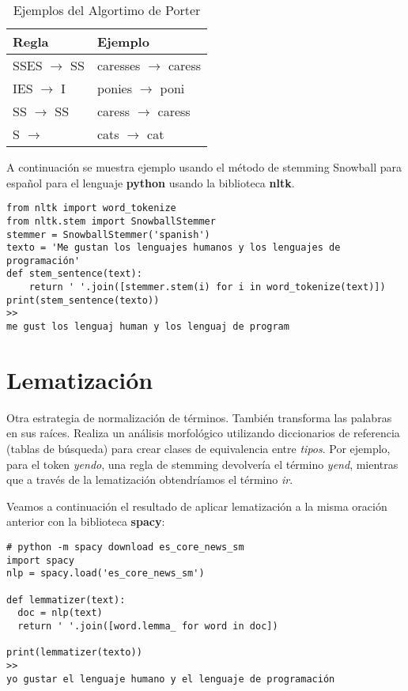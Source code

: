 \begin{table}[h]
\centering
\begin{tabular}{|l|l|}
\hline
Regla & Ejemplo \\
\hline
SSES $\rightarrow$ SS & caresses $\rightarrow$ caress \\
IES $\rightarrow$ I & ponies $\rightarrow$ poni \\
SS $\rightarrow$ SS & caress $\rightarrow$ caress \\
S $\rightarrow$ & cats $\rightarrow$ cat \\
\hline
\end{tabular}
\caption{Ejemplos del Algortimo de Porter}
\label{tab:porter}
\end{table}

A continuación se muestra ejemplo usando el método de stemming Snowball para español para el lenguaje \textbf{python} usando la biblioteca \textbf{nltk}.

\begin{verbatim}
from nltk import word_tokenize
from nltk.stem import SnowballStemmer
stemmer = SnowballStemmer('spanish')
texto = 'Me gustan los lenguajes humanos y los lenguajes de programación'
def stem_sentence(text):
    return ' '.join([stemmer.stem(i) for i in word_tokenize(text)])    
print(stem_sentence(texto))
>>
me gust los lenguaj human y los lenguaj de program
\end{verbatim}



\section{Lematización}
Otra estrategia de normalización de términos. También transforma las palabras en sus raíces.  Realiza un análisis morfológico utilizando diccionarios de referencia (tablas de búsqueda) para crear clases de equivalencia entre \emph{tipos}. Por ejemplo, para el token \emph{yendo}, una regla de stemming devolvería el término \emph{yend}, mientras que a través de la lematización obtendríamos el término \emph{ir}.

Veamos a continuación el resultado de aplicar lematización a la misma oración anterior con la biblioteca \textbf{spacy}:

\begin{verbatim}
# python -m spacy download es_core_news_sm
import spacy
nlp = spacy.load('es_core_news_sm')

def lemmatizer(text):  
  doc = nlp(text)
  return ' '.join([word.lemma_ for word in doc])

print(lemmatizer(texto))
>>
yo gustar el lenguaje humano y el lenguaje de programación
\end{verbatim}




